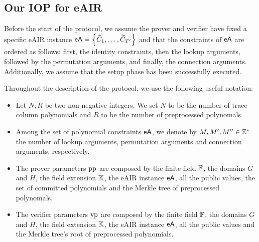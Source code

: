 \subsection{Our IOP for eAIR}\label{sec:our-IOP}

Before the start of the protocol, we assume the prover and verifier have fixed a specific eAIR instance $\textsf{eA} = \left\{\widetilde{C}_1,\dots,\widetilde{C}_{T'}\right\}$ and that the constraints of $\textsf{eA}$ are ordered as follows: first, the identity constraints, then the lookup arguments, followed by the permutation arguments, and finally, the connection arguments. Additionally, we assume that the setup phase has been successfully executed.

Throughout the description of the protocol, we use the following useful notation:
\begin{itemize}
  \item Let $N,R$ be two non-negative integers. We set $N$ to be the number of trace column polynomials and $R$ to be the number of preprocessed polynomals.
  \item Among the set of polynomial constraints $\textsf{eA}$, we denote by $M,M',M'' \in \mathbb{Z}^*$ the number of lookup arguments, permutation arguments and connection arguments, respectively. 
  \item The prover parameters $\text{pp}$ are composed by the finite field $\mathbb{F}$, the domains $G$ and $H$, the field extension $\mathbb{K}$, the eAIR instance $\textsf{eA}$, all the public values, the set of committed polynomials and the Merkle tree of preprocessed polynomals.
  \item The verifier parameters $\text{vp}$ are composed by the finite field $\mathbb{F}$, the domains $G$ and $H$, the field extension $\mathbb{K}$, the eAIR instance $\textsf{eA}$, all the public values and the Merkle tree's root of preprocessed polynomials.
\end{itemize}

